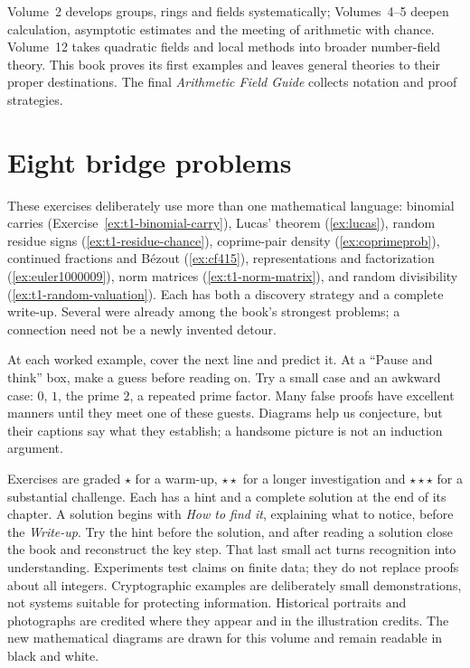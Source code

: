 Volume~2 develops groups, rings and fields systematically; Volumes~4--5 deepen
calculation, asymptotic estimates and the meeting of arithmetic with chance.
Volume~12 takes quadratic fields and local methods into broader number-field
theory. This book proves its first examples and leaves general theories to
their proper destinations. The final \emph{Arithmetic Field Guide} collects
notation and proof strategies.

\section*{Eight bridge problems}
These exercises deliberately use more than one mathematical language:
binomial carries (Exercise~\ref{ex:t1-binomial-carry}), Lucas' theorem
(\ref{ex:lucas}), random residue signs (\ref{ex:t1-residue-chance}),
coprime-pair density (\ref{ex:coprimeprob}), continued fractions and
B\'ezout (\ref{ex:cf415}), representations and factorization
(\ref{ex:euler1000009}), norm matrices (\ref{ex:t1-norm-matrix}),
and random divisibility (\ref{ex:t1-random-valuation}).
Each has both a discovery strategy and a complete write-up.
Several were already among the book's strongest problems;
a connection need not be a newly invented detour.

At each worked example, cover the next line and predict it. At a ``Pause and think'' box, make a guess before
reading on. Try a small case and an awkward case: $0$, $1$, the prime $2$, a repeated prime factor. Many false
proofs have excellent manners until they meet one of these guests. Diagrams help us conjecture, but their
captions say what they establish; a handsome picture is not an induction argument.

Exercises are graded \textbf{$\star$} for a warm-up, \textbf{$\star\star$} for a longer investigation and
\textbf{$\star\star\star$} for a substantial challenge. Each has a hint and a complete solution at the end of its
chapter. A solution begins with \emph{How to find it}, explaining what to notice, before the \emph{Write-up}.
Try the hint before the solution, and after reading a solution close the book and reconstruct the key step.
That last small act turns recognition into understanding. Experiments test claims on finite data;
they do not replace proofs about all integers. Cryptographic examples are deliberately small demonstrations,
not systems suitable for protecting information. Historical portraits and photographs are credited where they
appear and in the illustration credits. The new mathematical diagrams are drawn for this volume and remain
readable in black and white.
